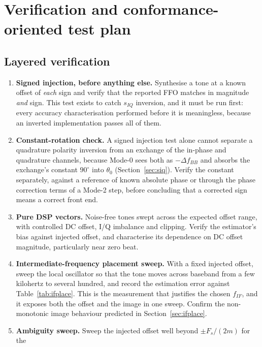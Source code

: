 \documentclass[11pt,a4paper]{article}
\begin{document}
\section{Verification and conformance-oriented test plan}
\label{sec:verify}

\subsection{Layered verification}

\begin{enumerate}[leftmargin=1.7em,itemsep=2pt]
  \item \textbf{Signed injection, before anything else.} Synthesise a tone at a known offset of
    \emph{each} sign and verify that the reported FFO matches in magnitude \emph{and} sign. This test
    exists to catch $s_{IQ}$ inversion, and it must be run first: every accuracy characterisation
    performed before it is meaningless, because an inverted implementation passes all of them.
  \item \textbf{Constant-rotation check.} A signed injection test alone cannot separate a quadrature
    polarity inversion from an exchange of the in-phase and quadrature channels, because Mode-0 sees
    both as $-\Delta f_{BB}$ and absorbs the exchange's constant $90^{\circ}$ into $\theta_0$
    (Section~\ref{sec:siq}). Verify the constant separately, against a reference of known absolute
    phase or through the phase correction terms of a Mode-2 step, before concluding that a corrected
    sign means a correct front end.
  \item \textbf{Pure DSP vectors.} Noise-free tones swept across the expected offset range, with
    controlled DC offset, I/Q imbalance and clipping. Verify the estimator's bias against injected
    offset, and characterise its dependence on DC offset magnitude, particularly near zero beat.
  \item \textbf{Intermediate-frequency placement sweep.} With a fixed injected offset, sweep the
    local oscillator so that the tone moves across baseband from a few kilohertz to several hundred,
    and record the estimation error against Table~\ref{tab:ifplace}. This is the measurement that
    justifies the chosen $f_{IF}$, and it exposes both the offset and the image in one sweep. Confirm
    the non-monotonic image behaviour predicted in Section~\ref{sec:ifplace}.
  \item \textbf{Ambiguity sweep.} Sweep the injected offset well beyond $\pm F_s/(2m)$ for the

\end{enumerate}
\end{document}
